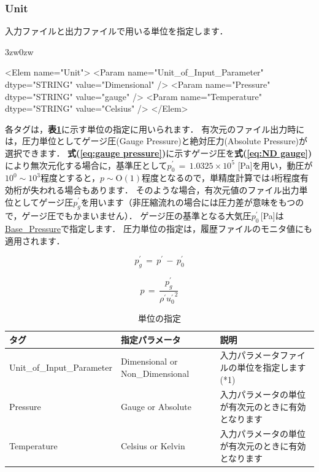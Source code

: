 \pagebreak
\subsubsection{Unit}
\label{sec:p_unit}

入力ファイルと出力ファイルで用いる\hypertarget{tgt:unit}{単位を指定}します．

\begin{indentation}{3zw}{0zw}

{\small
\begin{program}
<Elem name="Unit">
  <Param name="Unit_of_Input_Parameter" dtype="STRING"  value="Dimensional" />
  <Param name="Pressure"                dtype="STRING"  value="gauge" />
  <Param name="Temperature"             dtype="STRING"  value="Celsius" />
</Elem>
\end{program}
}

各タグは，\textbf{表\ref{tbl:param_unit}}に示す単位の指定に用いられます．
有次元のファイル出力時には，圧力単位としてゲージ圧(Gauge Pressure)と絶対圧力(Absolute Pressure)が選択できます．
\textbf{式(\ref{eq:gauge pressure})}に示すゲージ圧を\textbf{式(\ref{eq:ND gauge})}により無次元化する場合に，基準圧として$p_0^\prime\,=\,1.0325\times 10^5$ [Pa]を用い，動圧が$10^0 \sim 10^3$程度とすると，$p \sim \mathrm{O}(1)$程度となるので，単精度計算では4桁程度有効桁が失われる場合もあります．
そのような場合，有次元値のファイル出力単位としてゲージ圧$p_g^\prime$を用います（非圧縮流れの場合には圧力差が意味をもつので，ゲージ圧でもかまいません）．
ゲージ圧の基準となる大気圧$p_0^\prime\,$[Pa]は\hyperlink{tgt:reference}{Base\_Pressure}で指定します．
圧力単位の指定は，履歴ファイルのモニタ値にも適用されます．

\begin{equation}
p_g^\prime \,=\, p^\prime \,-\, p_0^\prime
\label{eq:gauge pressure}
\end{equation}

\begin{equation}
p \,=\, \frac{p_g^\prime}{\rho^\prime {u_0^\prime}^2}
\label{eq:ND gauge}
\end{equation}

\begin{table}[htdp]
\caption{単位の指定}
\begin{center}
\small
\begin{tabular}{lll} \toprule
タグ & 指定パラメータ & 説明\\ \midrule
Unit\_of\_Input\_Parameter & Dimensional or Non\_Dimensional & 入力パラメータファイルの単位を指定します(*1)\\
Pressure & Gauge or Absolute & 入力パラメータの単位が有次元のときに有効となります\\
Temperature & Celsius or Kelvin & 入力パラメータの単位が有次元のときに有効となります\\\bottomrule
\end{tabular}
\end{center}
\label{tbl:param_unit}
\end{table}

\end{indentation}



